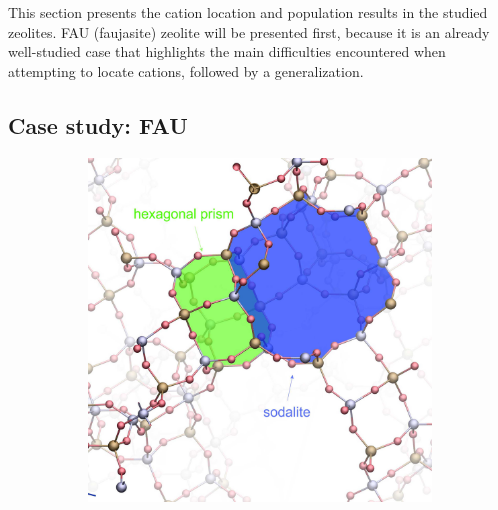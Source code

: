 \documentclass[main.tex]{subfiles}
\begin{document}
This section presents the cation location and population results in the studied zeolites. FAU (faujasite) zeolite will be presented first, because it is an already well-studied case that highlights the main difficulties encountered when attempting to locate cations, followed by a generalization.

\subsection{Case study: FAU}

\label{casestudyFAU}

\begin{figure}
	\centering
	\hfill\begin{subfigure}{0.45\columnwidth}
		\centering
		\includegraphics[width=\columnwidth]{figures/cations/FAU1_cages_text.jpg}
		\label{fig:FAUdetail}
	\end{subfigure}\hfill%
	\begin{subfigure}{0.45\columnwidth}
		\centering

\end{subfigure}
\end{figure}
\end{document}
